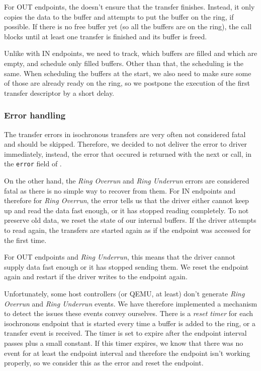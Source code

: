 For OUT endpoints, the  doesn't ensure that the transfer
finishes. Instead, it only copies the data to the buffer and attempts to put
the buffer on the ring, if possible. If there is no free buffer yet (so all the
buffers are on the ring), the call blocks until at least one transfer is
finished and its buffer is freed.

Unlike with IN endpoints, we need to track, which buffers are filled and which
are empty, and schedule only filled buffers. Other than that, the scheduling is
the same. When scheduling the buffers at the start, we also need to make sure
some of those are already ready on the ring, so we postpone the execution of
the first transfer descriptor by a short delay.

\subsubsection{Error handling}

The transfer errors in isochronous transfers are very often not considered fatal and should be skipped. Therefore, we decided to not deliver the
error to driver immediately, instead, the error that occured is returned with
the next  or  call, in the \texttt{error} field of
.

On the other hand, the \textit{Ring Overrun} and \textit{Ring Underrun} errors
are considered fatal as there is no simple way to recover from them. For IN
endpoints and therefore for \textit{Ring Overrun}, the error tells us that the
driver either cannot keep up and read the data fast enough, or it has stopped
reading completely. To not preserve old data, we reset the state of our
internal buffers. If the driver attempts to read again, the transfers are
started again as if the endpoint was accessed for the first time.

For OUT endpoints and \textit{Ring Underrun}, this means that the driver cannot
supply data fast enough or it has stopped sending them. We reset the endpoint
again and restart if the driver writes to the endpoint again.

Unfortunately, some host controllers (or QEMU, at least) don't generate
\textit{Ring Overrun} and \textit{Ring Underrun} events. We have therefore
implemented a mechanism to detect the issues these events convey ourselves.
There is a \textit{reset timer} for each isochronous endpoint that is started
every time a buffer is added to the ring, or a transfer event is received. The
timer is set to expire after the endpoint interval passes plus a small
constant. If this timer expires, we know that there was no event for at least
the endpoint interval and therefore the endpoint isn't working properly, so we
consider this as the error and reset the endpoint.
